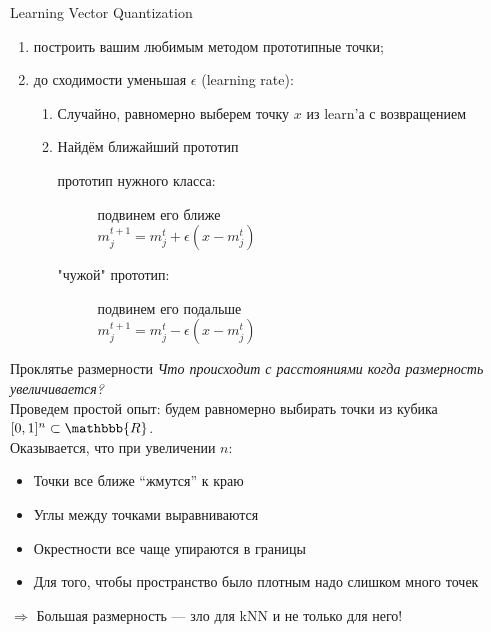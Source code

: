 \documentclass[14pt, fleqn, xcolor={dvipsnames, table}]{beamer}
\begin{document}
\begin{frame}{Learning Vector Quantization}
\begin{enumerate}
   \item построить вашим любимым методом прототипные точки;
   \item до сходимости уменьшая $\epsilon$ (learning rate): 
    \begin{enumerate}
      \item Случайно, равномерно выберем точку $x$ из learn'а с возвращением
      \item Найдём ближайший прототип
      \begin{description}
        \item [\color{blue}прототип нужного класса:] подвинем его ближе \\
        $ m_j^{t+1} = m_j^t + \epsilon (x - m_j^t)$ \\
        \item [\color{blue}"чужой" прототип:] подвинем его подальше \\
        $ m_j^{t+1} = m_j^t - \epsilon (x - m_j^t)$
      \end{description}
    \end{enumerate}
\end{enumerate}
\end{frame}

\begin{frame}{Проклятье размерности}
\emph{Что происходит с расстояниями когда размерность увеличивается?} \\
Проведем простой опыт: будем равномерно выбирать точки из кубика $[0, 1]^n \subset \mathbbb{R}$. \\
Оказывается, что при увеличении $n$:
\begin{itemize}
  \item Точки все ближе “жмутся” к краю
  \item Углы между точками выравниваются
  \item Окрестности все чаще упираются в границы
  \item Для того, чтобы пространство было плотным надо слишком много точек
\end{itemize}
$\Rightarrow$ Большая размерность — зло для kNN и не только для него!
\end{frame}
\end{document}
